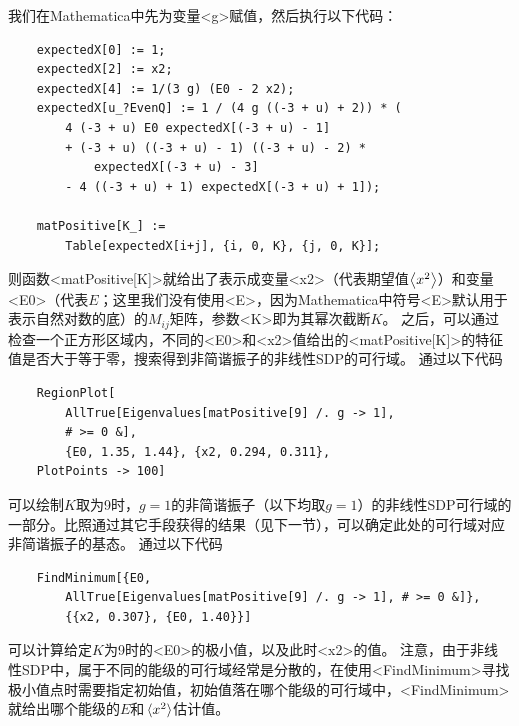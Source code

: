\documentclass[oneside]{fduthesis}
\def\texttt#1{<#1>}%
\begin{document}
我们在Mathematica中先为变量\texttt{g}赋值，然后执行以下代码：
\lstset{language=Mathematica,basicstyle=\small\ttfamily}
\begin{lstlisting}
    expectedX[0] := 1;
    expectedX[2] := x2;
    expectedX[4] := 1/(3 g) (E0 - 2 x2);
    expectedX[u_?EvenQ] := 1 / (4 g ((-3 + u) + 2)) * (
        4 (-3 + u) E0 expectedX[(-3 + u) - 1] 
        + (-3 + u) ((-3 + u) - 1) ((-3 + u) - 2) *
            expectedX[(-3 + u) - 3] 
        - 4 ((-3 + u) + 1) expectedX[(-3 + u) + 1]);

    matPositive[K_] := 
        Table[expectedX[i+j], {i, 0, K}, {j, 0, K}];
\end{lstlisting}
则函数\texttt{matPositive[K]}就给出了表示成变量\texttt{x2}（代表期望值$\expval{x^2}$）和变量\texttt{E0}（代表$E$；这里我们没有使用\texttt{E}，因为Mathematica中符号\texttt{E}默认用于表示自然对数的底）的$M_{ij}$矩阵，参数\texttt{K}即为其幂次截断$K$。
之后，可以通过检查一个正方形区域内，不同的\texttt{E0}和\texttt{x2}值给出的\texttt{matPositive[K]}的特征值是否大于等于零，搜索得到非简谐振子的非线性SDP的可行域。
通过以下代码
\begin{lstlisting}
    RegionPlot[
        AllTrue[Eigenvalues[matPositive[9] /. g -> 1], 
        # >= 0 &], 
        {E0, 1.35, 1.44}, {x2, 0.294, 0.311}, 
    PlotPoints -> 100]
\end{lstlisting}
可以绘制$K$取为9时，$g=1$的非简谐振子（以下均取$g=1$）的非线性SDP可行域的一部分。比照通过其它手段获得的结果（见下一节），可以确定此处的可行域对应非简谐振子的基态。
通过以下代码
\begin{lstlisting}
    FindMinimum[{E0, 
        AllTrue[Eigenvalues[matPositive[9] /. g -> 1], # >= 0 &]}, 
        {{x2, 0.307}, {E0, 1.40}}]
\end{lstlisting}
可以计算给定$K$为9时的\texttt{E0}的极小值，以及此时\texttt{x2}的值。
注意，由于非线性SDP中，属于不同的能级的可行域经常是分散的，在使用\texttt{FindMinimum}寻找极小值点时需要指定初始值，初始值落在哪个能级的可行域中，\texttt{FindMinimum}就给出哪个能级的$E$和$\expval*{x^2}$估计值。
\end{document}
